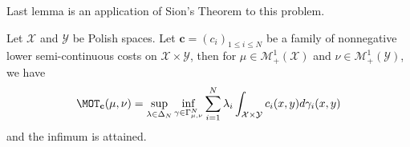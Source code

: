 Last lemma is an application of Sion's Theorem to this problem.
\begin{lemma}
\label{lem:technical-lemma-primal}
Let $\mathcal{X}$ and $\mathcal{Y}$ be Polish spaces. Let $\mathbf{c}=(c_i)_{1\leq i\leq N}$ be a family of nonnegative lower semi-continuous costs on $\mathcal{X}\times \mathcal{Y}$, then for $\mu\in\mathcal{M}^1_+(\mathcal{X})$ and  $\nu\in\mathcal{M}^1_+(\mathcal{Y})$, we have
\begin{align}
\label{eq:supinf}
\MOT_{\mathbf{c}}(\mu,\nu)= \sup_{\lambda\in\Delta_N}\inf_{\gamma\in\Gamma_{\mu,\nu}^N} \sum_{i=1}^N\lambda_i\int_{\mathcal{X}\times\mathcal{Y}}c_i(x,y)d\gamma_i(x,y)
\end{align}
and the infimum is attained.
\end{lemma}
